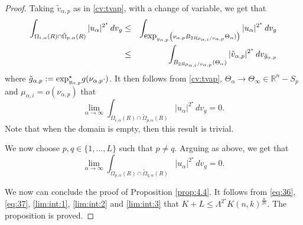 \documentclass[10pt,a4paper]{amsart}
\def \crit {2^\star}
\def \mai {\mu_{\alpha,i}}
\def \nap {\nu_{\alpha,p}}
\def \rn {\mathbb{R}^n}
\def \tvap {\tilde{v}_{\alpha,p}}
\def \ua {u_\alpha}
\def \yap {y_{\alpha,p}}
\begin{document}
\begin{proof}
\smallskip\noindent Taking $\tvap$ as in \eqref{cv:tvap}, with a change of variable, we get that
\begin{eqnarray*}\int_{\Omega_{i,\alpha}(R)\cap \tilde{\Omega}_{p,\alpha}(R)}|\ua|^{\crit}\, dv_g&\leq& \int_{\hbox{exp}_{\yap}\left(\nap B_{2R\mai/\nap}\Theta_\alpha)\right)}|\ua|^{\crit}\, dv_g\\
&\leq& \int_{B_{2R\mai/\nap}(\Theta_\alpha)}|\tvap|^{\crit}\, dv_{\tilde{g}_{\alpha,p}}
\end{eqnarray*}
where $\tilde{g}_{\alpha,p}:=\hbox{exp}_{\yap}^{\star}g(\nap\cdot)$. It then follows from \eqref{cv:tvap}, $\Theta_\alpha\to\Theta_\infty\in\rn-S_p$ and  $\mai=o(\nap)$ that 
\begin{equation}\label{lim:int:2}
\lim_{\alpha\to \infty}\int_{\Omega_{i,\alpha}(R)\cap \tilde{\Omega}_{p,\alpha}(R)}|\ua|^{\crit}\, dv_g=0.
\end{equation}
Note that when the domain is empty, then this result is trivial.

\medskip\noindent We now choose $p,q\in \{1,...,L\}$ such that $p\neq q$. Arguing as above, we get that
\begin{equation}\label{lim:int:3}
\lim_{\alpha\to \infty}\int_{\tilde{\Omega}_{p,\alpha}(R)\cap \tilde{\Omega}_{q,\alpha}(R)}|\ua|^{\crit}\, dv_g=0.
\end{equation}


\smallskip\noindent We now can conclude the proof of Proposition \ref{prop:4.4}. It follows from \eqref{eq:36}, \eqref{eq:37}, \eqref{lim:int:1}, \eqref{lim:int:2} and \eqref{lim:int:3} that  $K+L\leq \Lambda^{\crit} K(n,k)^{\frac{n}{2k}}$. The proposition is proved.\end{proof}
\end{document}
